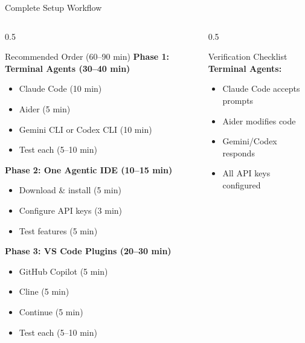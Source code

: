 \documentclass[aspectratio=169,11pt]{beamer}
\begin{document}
\begin{frame}{Complete Setup Workflow}
    \begin{columns}[T]
        \begin{column}{0.5\textwidth}
            \begin{block}{Recommended Order (60--90 min)}
                \textbf{Phase 1: Terminal Agents (30--40 min)}
                \begin{itemize}
                    \item Claude Code (10 min)
                    \item Aider (5 min)
                    \item Gemini CLI or Codex CLI (10 min)
                    \item Test each (5--10 min)
                \end{itemize}

                \textbf{Phase 2: One Agentic IDE (10--15 min)}
                \begin{itemize}
                    \item Download \& install (5 min)
                    \item Configure API keys (3 min)
                    \item Test features (5 min)
                \end{itemize}

                \textbf{Phase 3: VS Code Plugins (20--30 min)}
                \begin{itemize}
                    \item GitHub Copilot (5 min)
                    \item Cline (5 min)
                    \item Continue (5 min)
                    \item Test each (5--10 min)
                \end{itemize}
            \end{block}
        \end{column}
        \begin{column}{0.5\textwidth}
            \begin{exampleblock}{Verification Checklist}
                \textbf{Terminal Agents:}
                \begin{itemize}
                    \item[$\square$] Claude Code accepts prompts
                    \item[$\square$] Aider modifies code
                    \item[$\square$] Gemini/Codex responds
                    \item[$\square$] All API keys configured
                \end{itemize}


\end{exampleblock}
\end{column}
\end{columns}
\end{frame}
\end{document}
